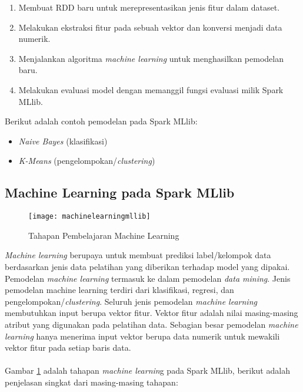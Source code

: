 \begin{enumerate}
\item Membuat RDD baru untuk merepresentasikan jenis fitur dalam dataset.
\item Melakukan ekstraksi fitur pada sebuah vektor dan konversi menjadi data numerik.
\item Menjalankan algoritma \textit{machine learning} untuk menghasilkan pemodelan baru.
\item Melakukan evaluasi model dengan memanggil fungsi evaluasi milik Spark MLlib.
\end{enumerate}

\noindent Berikut adalah contoh pemodelan pada Spark MLlib:

\begin{itemize}
\item \textit{Naive Bayes} (klasifikasi)
\item \textit{K-Means} (pengelompokan/\textit{clustering})
\end{itemize}

\subsection{Machine Learning pada Spark MLlib}
\label{sec:ml_sparkmllib}
\begin{figure}[H]
	\centering
	\texttt{[image: machinelearningmllib]}
	\caption{Tahapan Pembelajaran Machine Learning}
	\label{fig:machinelearningmllib}
\end{figure}
\textit{Machine learning} berupaya untuk membuat prediksi label/kelompok data berdasarkan jenis data pelatihan yang diberikan terhadap model yang dipakai. Pemodelan \textit{machine learning} termasuk ke dalam pemodelan \textit{data mining}. Jenis pemodelan machine learning terdiri dari klasifikasi, regresi, dan pengelompokan/\textit{clustering}. Seluruh jenis pemodelan \textit{machine learning} membutuhkan input berupa vektor fitur. Vektor fitur adalah nilai masing-masing atribut yang digunakan pada pelatihan data. Sebagian besar pemodelan \textit{machine learning} hanya menerima input vektor berupa data numerik untuk mewakili vektor fitur pada setiap baris data.
\\\\
\noindent Gambar \ref{fig:machinelearningmllib} adalah tahapan \textit{machine learnin}g pada Spark MLlib, berikut adalah penjelasan singkat dari masing-masing tahapan:

